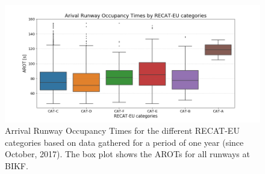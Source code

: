 \begin{figure}
    \centering
    \includegraphics[width=1\textwidth]{graphics/fig_RECAT_AROTs_boxplot.png}
    \caption[AROTs boxplot for RECAT categories, all runways]{Arrival Runway Occupancy Times for the different RECAT-EU categories based on data gathered for a period of one year (since October, 2017). The box plot shows the AROTs for all runways at BIKF.}
    \label{fig:RECAT_AROTs_boxplot}
\end{figure}


\begin{table}[]
\centering
{}
\caption[AROTs for the air traffic mix by RECAT]{AROT statistics for the air traffic mix at KEF by RECAT-EU categories. The count is the number of landings in peak hours since October 2017}
\label{tab:AROT_RECAT_stats}
\end{table}


